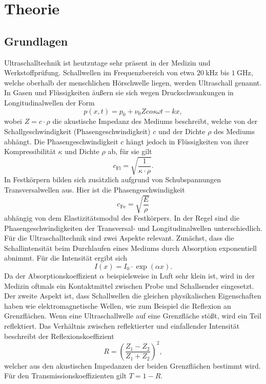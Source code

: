 \section{Theorie}
\label{sec:Theorie}


\subsection{Grundlagen}
Ultraschalltechnik ist heutzutage sehr präsent in der Medizin und Werkstoffprüfung.
Schallwellen im Frequenzbereich von etwa $\SI{20}{\kilo\hertz}$ bis $\SI{1}{\giga\hertz}$, welche oberhalb der menschlichen Hörschwelle liegen, werden Ultraschall genannt.
In Gasen und Flüssigkeiten äußern sie sich wegen Druckschwankungen in Longitudinalwellen der Form
\begin{equation}
  p(x,t) = p_0 + \nu_0 Z cos{\omega t -kx},
\end{equation}
wobei $Z = c \cdot \rho$ die akustische Impedanz des Mediums beschreibt, welche von der Schallgeschwindigkeit (Phasengeschwindigkeit) $c$ und der Dichte $\rho$ des Mediums abhängt.
Die Phasengeschwindigkeit $c$ hängt jedoch in Flüssigkeiten von ihrer Kompressibilität $\kappa$ und Dichte $\rho$ ab, für sie gilt
\begin{equation}
  c_{\text{Fl}} = \sqrt{\frac{1}{\kappa \cdot \rho}}.
\end{equation}
In Festkörpern bilden sich zusätzlich aufgrund von Schubspannungen Transversalwellen aus.
Hier ist die Phasengeschwindigkeit
\begin{equation}
  c_{\text{Fe}} = \sqrt{\frac{E}{\rho}}
\end{equation}
abhängig von dem Elastizitätsmodul des Festkörpers.
In der Regel sind die Phasengeschwindigkeiten der Transversal- und Longitudinalwellen unterschiedlich.\\
Für die Ultraschalltechnik sind zwei Aspekte relevant.
Zunächst, dass die Schallintensität beim Durchlaufen eines Mediums durch Absorption exponentiell abnimmt.
Für die Intensität ergibt sich
\begin{equation}
  I(x) = I_0 \cdot \exp(\alpha x). \label{gl:1}
\end{equation}
Da der Absorptionskoeffizient $\alpha$ beispielsweise in Luft sehr klein ist, wird in der Medizin oftmals ein Kontaktmittel zwischen Probe und Schallsender eingesetzt.\\
Der zweite Aspekt ist, dass Schallwellen die gleichen physikalischen Eigenschaften haben wie elektromagnetische Wellen, wie zum Beispiel die Reflexion an Grenzflächen.
Wenn eine Ultraschallwelle auf eine Grenzfläche stößt, wird ein Teil reflektiert.
Das Verhältnis zwischen reflektierter und einfallender Intensität beschreibt der Reflexionskoeffizient
\begin{equation}
  R = \left(\frac{Z_1-Z_2}{Z_1+Z_2}\right)^2,
\end{equation}
welcher aus den akustischen Impedanzen der beiden Grenzflächen bestimmt wird.
Für den Transmissionskoeffizienten gilt $T = 1 - R$.

